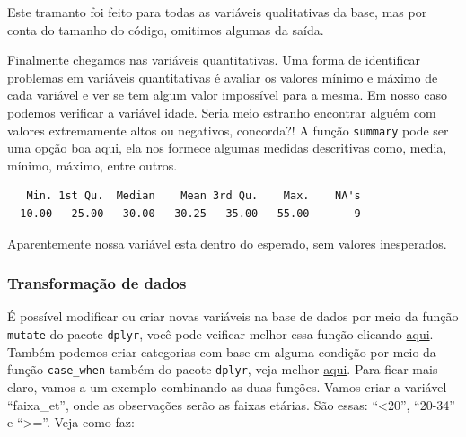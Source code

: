 \documentclass[
  letterpaper,
  DIV=11,
  numbers=noendperiod]{scrreprt}
\newenvironment{Shaded}{\begin{snugshade}}{\end{snugshade}}
\newcommand{\FunctionTok}[1]{\textcolor[rgb]{0.28,0.35,0.67}{#1}}
\newcommand{\NormalTok}[1]{\textcolor[rgb]{0.00,0.23,0.31}{#1}}
\newcommand{\SpecialCharTok}[1]{\textcolor[rgb]{0.37,0.37,0.37}{#1}}
\begin{document}
Este tramanto foi feito para todas as variáveis qualitativas da base,
mas por conta do tamanho do código, omitimos algumas da saída.

Finalmente chegamos nas variáveis quantitativas. Uma forma de
identificar problemas em variáveis quantitativas é avaliar os valores
mínimo e máximo de cada variável e ver se tem algum valor impossível
para a mesma. Em nosso caso podemos verificar a variável idade. Seria
meio estranho encontrar alguém com valores extremamente altos ou
negativos, concorda?! A função \texttt{summary} pode ser uma opção boa
aqui, ela nos formece algumas medidas descritivas como, media, mínimo,
máximo, entre outros.

\begin{Shaded}
\end{Shaded}

\begin{verbatim}
   Min. 1st Qu.  Median    Mean 3rd Qu.    Max.    NA's 
  10.00   25.00   30.00   30.25   35.00   55.00       9 
\end{verbatim}

Aparentemente nossa variável esta dentro do esperado, sem valores
inesperados.

\hypertarget{transformauxe7uxe3o-de-dados}{%
\subsubsection{Transformação de
dados}\label{transformauxe7uxe3o-de-dados}}

É possível modificar ou criar novas variáveis na base de dados por meio
da função \texttt{mutate} do pacote \texttt{dplyr}, você pode veificar
melhor essa função clicando
\href{https://dplyr.tidyverse.org/reference/mutate.html}{aqui}. Também
podemos criar categorias com base em alguma condição por meio da função
\texttt{case\_when} também do pacote \texttt{dplyr}, veja melhor
\href{https://dplyr.tidyverse.org/reference/case_when.html?q=case_when\#ref-usage}{aqui}.
Para ficar mais claro, vamos a um exemplo combinando as duas funções.
Vamos criar a variável ``faixa\_et'', onde as observações serão as
faixas etárias. São essas: ``\textless20'', ``20-34'' e
``\textgreater=''. Veja como faz:
\end{document}

